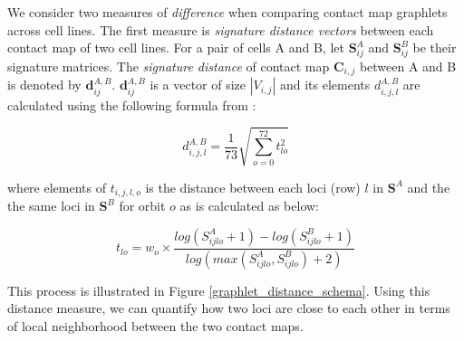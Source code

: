\documentclass[a4,center,fleqn]{NAR}
\begin{document}

We consider two measures of \textit{difference} when comparing contact
map graphlets across cell lines. 
The first measure is \textit{signature distance vectors} between
each contact map of two cell lines. 
For a pair of cells A and B, let 
$\mathbf{S}^A_{ij}$  and $\mathbf{S}^B_{ij}$ be their
signature matrices. The \textit{signature distance} of
contact map $\mathbf{C}_{i,j}$ between A and B is denoted
by $\mathbf{d}^{\scriptscriptstyle A,B}_{ij}$. $\mathbf{d}^{\scriptscriptstyle A,B}_{ij}$ 
is a vector of size $|V_{i,j}|$
and its elements $d^{\scriptscriptstyle A,B}_{i,j,l}$ are
calculated using the following formula from \cite{prvzulj2007biological}:

\begin{equation}
    d^{\scriptscriptstyle A,B}_{i,j,l} = 
    \frac{1}{73}\sqrt{\sum_{o=0}^{72}{t_{lo}^2}}
    \label{eq:distance_total}
\end{equation}

where elements of $t_{i,j,l,o}$ is the
distance between each
loci (row) $l$ in $\mathbf{S}^A$ and the the same loci in 
$\mathbf{S}^B$ for
orbit $o$ as is calculated as below:

\begin{equation}
    t_{lo} = w_o \times 
    \frac{log(S_{ijlo}^A+1) - log(S_{ijlo}^B+1)}
    {log(max(S_{ijlo}^A, S_{ijlo}^B) + 2)}
    \label{eq:distance_single}
\end{equation}


This process is illustrated in Figure \ref{graphlet_distance_schema}.
Using this distance measure, we can quantify how two loci are close to
each other in terms of local neighborhood between the two contact maps.
\end{document}
